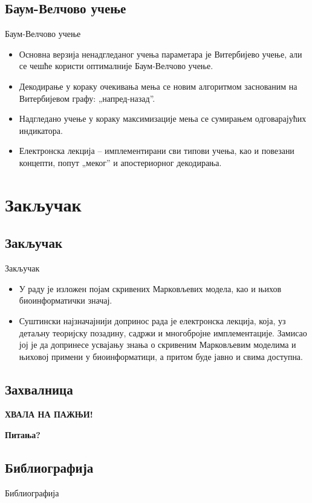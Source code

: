 \documentclass[hyperref={bookmarks=false}]{beamer}
\begin{document}
\subsection{Баум-Велчово учење}
\begin{frame}{Баум-Велчово учење}
\begin{itemize}
\item Основна верзија ненадгледаног учења параметара је Витербијево учење, али се чешће користи оптималније Баум-Велчово учење.
\item Декодирање у кораку очекивања мења се новим алгоритмом заснованим на Витербијевом графу: „напред-назад”.
\item Надгледано учење у кораку максимизације мења се сумирањем одговарајућих индикатора.
\item Електронска лекција -- имплементирани сви типови учења, као и повезани концепти, попут „меког” и апостериорног декодирања.
\end{itemize}
\end{frame}

\section{Закључак}
\subsection{Закључак}
\begin{frame}{Закључак}
\begin{itemize}
\item У раду је изложен појам скривених Марковљевих модела, као и њихов биоинформатички значај.
\item Суштински најзначајнији допринос рада је електронска лекција, која, уз детаљну теоријску позадину, садржи и многобројне имплементације. Замисао јој је да допринесе усвајању знања о скривеним Марковљевим моделима и њиховој примени у биоинформатици, а притом буде јавно и свима доступна.
\end{itemize}
\end{frame}

\subsection{Захвалница}
\begin{frame}
\centering \LARGE
\textbf{ХВАЛА НА ПАЖЊИ!}

\textbf{Питања?}
\end{frame}

\subsection{Библиографија}
\begin{frame}{Библиографија}
\nocite{*}


\end{frame}
\end{document}
